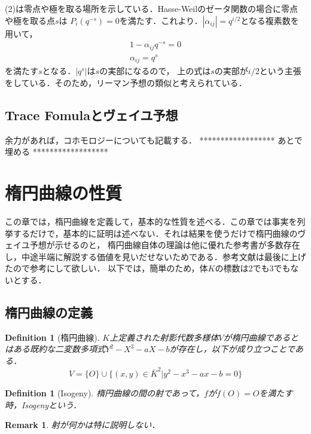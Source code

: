 \documentclass{ujarticle}
\newtheorem{dfn}[thm]{Definition}
\newtheorem*{rem}{Remark}
\begin{document}
(2)は零点や極を取る場所を示している．Hasse-Weilのゼータ関数の場合に零点や極を取る点$s$は
$P_i(q^{-s})=0$を満たす．これより．$|\alpha_{ij}|=q^{i/2}$となる複素数を用いて，
\begin{eqnarray*}
   1- \alpha_{ij} q^{-s}=0  \\
   \alpha_{ij} =q^{s}
\end{eqnarray*}
を満たす$s$となる．$|q^{s}|$は$s$の実部になるので，
上の式は$s$の実部が$i/2$という主張をしている．そのため，リーマン予想の類似と考えられている．


\subsection{Trace Fomulaとヴェイユ予想}
\label{sub:Trace Fomulaとヴェイユ予想}

余力があれば，コホモロジーについても記載する．
******************
 あとで埋める
******************

\section{楕円曲線の性質}
\label{sec:楕円曲線の性質}
この章では，楕円曲線を定義して，基本的な性質を述べる．この章では事実を列挙するだけで，基本的に証明は述べない．それは結果を使うだけで楕円曲線のヴェイユ予想が示せるのと，
楕円曲線自体の理論は他に優れた参考書が多数存在し，中途半端に解説する価値を見いだせないためである．参考文献は最後に上げたので参考にして欲しい．
以下では，簡単のため，体$K$の標数は2でも3でもないとする．

\subsection{楕円曲線の定義}
\label{sub:楕円曲線の定義}

\begin{dfn}[楕円曲線]
  $K$上定義された射影代数多様体$V$が楕円曲線であるとはある既約な二変数多項式$Y^2 - X^3 - aX - b$が存在し，以下が成り立つことである．
  \begin{equation*}
   V=\{O \} \cup \{ (x,y) \in \overline{K}^2 | y^2 - x^3 - ax - b=0 \}
  \end{equation*}
\end{dfn}

\begin{dfn}[Isogeny]
楕円曲線の間の射であって，$f$が$f(O)=O$を満たす時，Isogenyという．
\end{dfn}
\begin{rem}
 射が何かは特に説明しない．
\end{rem}
\end{document}
